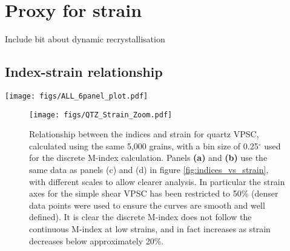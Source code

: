 \documentclass[a4paper,12pt]{report}
\numberwithin{equation}{chapter}
\begin{document}
\section{Proxy for strain}

Include bit about dynamic recrystallisation

\subsection{Index-strain relationship}
\begin{figure*}[p]
  \centering
    \texttt{[image: figs/ALL\_6panel\_plot.pdf]}
  \caption[Relation of indices to strain (VPSC)]{Relationship between the J-index, continuous M-index and discrete M-index to sample strain. Data are from VPSC models, with the indices calculated using the same 5,000 grains at each strain step (this many grains ensures the results are in the convergent regime). Discrete M-index calculated with a bin size of 0.25$^\circ$. \textbf{Top row} shows data for olivine, \textbf{middle row} shows quartz and \textbf{bottom row} shows post-perovskite (P-PS). \textbf{Left column} shows data from an axial compression VPSC model, the \textbf{right column} shows data from a simple shear VPSC model. Note the change of scale on both y-axes in \textbf{f}. Applying these scales to other plots reduces clarity --- consistent scales on all other plots (within each column) allows for useful comparison (see text).}
  \label{fig:indices_vs_strain}
\end{figure*} 


\begin{figure}[h]
  \centering
    \texttt{[image: figs/QTZ\_Strain\_Zoom.pdf]}
  \caption[Relation of indices to strain (quartz VPSC)]{Relationship between the indices and strain for quartz VPSC, calculated using the same 5,000 grains, with a bin size of 0.25$^\circ$ used for the discrete M-index calculation. Panels \textbf{(a)} and \textbf{(b)} use the same data as panels (c) and (d) in figure \ref{fig:indices_vs_strain}, with different scales to allow clearer analysis. In particular the strain axes for the simple shear VPSC has been restricted to 50\% (denser data points were used to ensure the curves are smooth and well defined). It is clear the discrete M-index does not follow the continuous M-index at low strains, and in fact increases as strain decreases below approximately 20\%.}
  \label{fig:indices_vs_strain_qtz}
\end{figure} 
\end{document}
